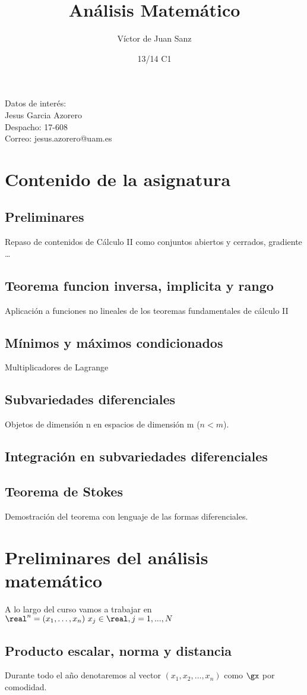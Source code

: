 \documentclass[a4paper,10pt]{apuntes}
\title{Análisis Matemático}
\author{Víctor de Juan Sanz}
\date{13/14 C1}
\begin{document}
\maketitle
\newpage
\tableofcontents
\newpage
Datos de interés:\\
Jesus Garcia Azorero\\
Despacho: 17-608\\
Correo: jesus.azorero@uam.es


\section{Contenido de la asignatura}
\subsection{Preliminares}
Repaso de contenidos de Cálculo II como conjuntos abiertos y cerrados, gradiente \dots
\subsection{Teorema funcion inversa, implicita y rango}
Aplicación a funciones no lineales de los teoremas fundamentales de cálculo II
\subsection{Mínimos y máximos condicionados}
Multiplicadores de Lagrange
\subsection{Subvariedades diferenciales}
Objetos de dimensión n en espacios de dimensión m ($n<m$).
\subsection{Integración en subvariedades diferenciales}
\subsection{Teorema de Stokes}
Demostración del teorema con lenguaje de las formas diferenciales.
\newpage


\section{Preliminares del análisis matemático}
A lo largo del curso vamos a trabajar en $\real^n={(x_1,\dotsc, x_n) \  x_j \in \real, j=1,...,N}$
\subsection{Producto escalar, norma y distancia}
Durante todo el año denotaremos al vector $(x_1,x_2,\dots,x_n)$ como $\gx$ por comodidad.
\end{document}
